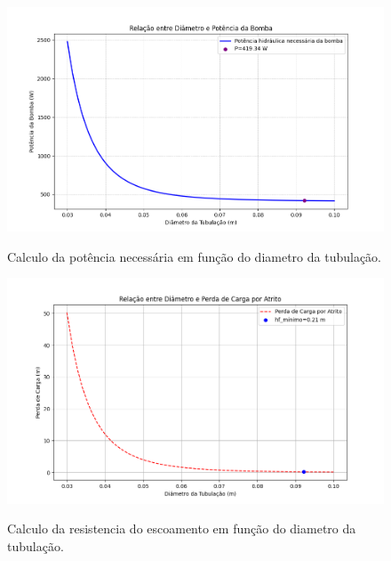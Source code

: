 \documentclass[12pt, a4paper]{article}
\begin{document}
            \begin{figure}[H]
                    \centering
                    \caption{Calculo da potência necessária em função do diametro da tubulação.}
                    \includegraphics[width=1.0\textwidth, height=0.4\textheight, keepaspectratio]{potencia_necessaria.png}
                    \label{fig:potencia}
            \end{figure}

            \begin{figure}[H]
                    \centering
                    \caption{Calculo da resistencia do escoamento em função do diametro da tubulação.}
                    \includegraphics[width=1.0\textwidth, height=0.4\textheight, keepaspectratio]{perda_carga.png}
                    \label{fig:hf}
            \end{figure}
\end{document}

